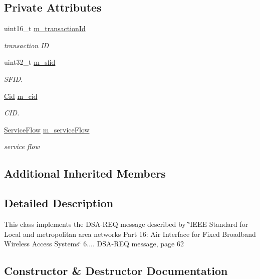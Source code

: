 \subsection*{Private Attributes}
\begin{DoxyCompactItemize}
\item 
uint16\+\_\+t \hyperlink{classns3_1_1DsaReq_af9e7af21b5dbab2fa644bbd68a807096}{m\+\_\+transaction\+Id}
\begin{DoxyCompactList}\small\item\em transaction ID \end{DoxyCompactList}\item 
uint32\+\_\+t \hyperlink{classns3_1_1DsaReq_ad01faff3f38505855b769cf988cb85ae}{m\+\_\+sfid}
\begin{DoxyCompactList}\small\item\em S\+F\+ID. \end{DoxyCompactList}\item 
\hyperlink{classns3_1_1Cid}{Cid} \hyperlink{classns3_1_1DsaReq_a5357229712f7a6be3c95226c06037eb4}{m\+\_\+cid}
\begin{DoxyCompactList}\small\item\em C\+ID. \end{DoxyCompactList}\item 
\hyperlink{classns3_1_1ServiceFlow}{Service\+Flow} \hyperlink{classns3_1_1DsaReq_ab226e61774135ace5dde5930a7695f09}{m\+\_\+service\+Flow}
\begin{DoxyCompactList}\small\item\em service flow \end{DoxyCompactList}\end{DoxyCompactItemize}
\subsection*{Additional Inherited Members}


\subsection{Detailed Description}
This class implements the D\+S\+A-\/\+R\+EQ message described by \char`\"{}\+I\+E\+E\+E Standard for
\+Local and metropolitan area networks Part 16\+: Air Interface for Fixed Broadband Wireless Access Systems\char`\"{} 6.... D\+S\+A-\/\+R\+EQ message, page 62 

\subsection{Constructor \& Destructor Documentation}
